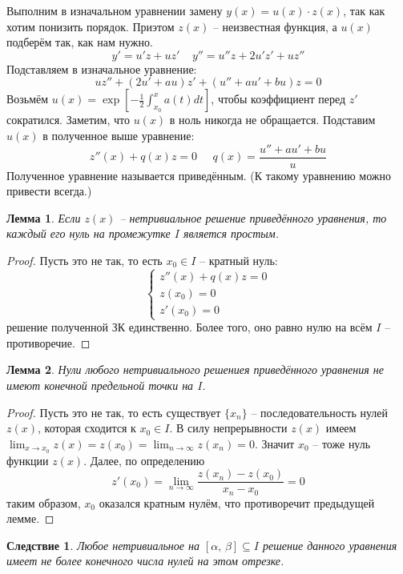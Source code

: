 \documentclass[a4paper,12pt]{article}
\theoremstyle{plain}
\newtheorem{lemma}{Лемма}[section]
\newtheorem*{corollary}{Следствие}
\theoremstyle{definition}
\theoremstyle{remark}
\begin{document}
Выполним в изначальном уравнении замену $y(x) = u(x) \cdot z(x)$, так как хотим понизить порядок. Приэтом $z(x)$ -- неизвестная функция, а $u(x)$ подберём так, как нам нужно.
\[y' = u'z + uz' \;\;\;\; y'' = u''z + 2u'z' + uz''\]
Подставляем в изначальное уравнение:
\[uz'' + (2u' + au)z' + (u'' + au' + bu)z = 0\]
Возьмём $u(x) = \exp\left[-\frac{1}{2}\int_{x_0}^xa(t)dt\right]$, чтобы коэффициент перед $z'$ сократился. Заметим, что $u(x)$ в ноль никогда не обращается. Подставим $u(x)$ в полученное выше уравнение:
\[z''(x) + q(x)z = 0\;\;\;\;\; q(x) = \frac{u'' + au' + bu}{u}\]
Полученное уравнение называется приведённым. (К такому уравнению можно привести всегда.)

\begin{lemma}
	Если $z(x)$ -- нетривиальное решение приведённого уравнения, то каждый его нуль на промежутке $I$ является простым.
\end{lemma}

\begin{proof}
	Пусть это не так, то есть $x_0 \in I$ -- кратный нуль:
	\[
		\begin{cases}
			z''(x) + q(x)z = 0 \\
			z(x_0) = 0         \\
			z'(x_0) = 0
		\end{cases}
	\]
	решение полученной ЗК единственно. Более того, оно равно нулю на всём $I$ -- противоречие.
\end{proof}

\begin{lemma}
	Нули любого нетривиального решениея приведённого уравнения не имеют конечной предельной точки на $I$.
\end{lemma}

\begin{proof}
	Пусть это не так, то есть существует $\{x_n\}$ -- последовательность нулей $z(x)$, которая сходится к $x_0 \in I$. В силу непрерывности $z(x)$ имеем $\lim_{x \to x_0}z(x) = z(x_0) = \lim_{n \to \infty} z(x_n) = 0$. Значит $x_0$ -- тоже нуль функции $z(x)$. Далее, по определению
	\[z'(x_0) = \lim_{n \to \infty} \frac{z(x_n) - z(x_0)}{x_n - x_0} = 0\]
	таким образом, $x_0$ оказался кратным нулём, что противоречит предыдущей лемме.
\end{proof}

\begin{corollary}
	Любое нетривиальное на $[\alpha,\, \beta] \subseteq I$ решение данного уравнения имеет не более конечного числа нулей на этом отрезке.
\end{corollary}
\end{document}

